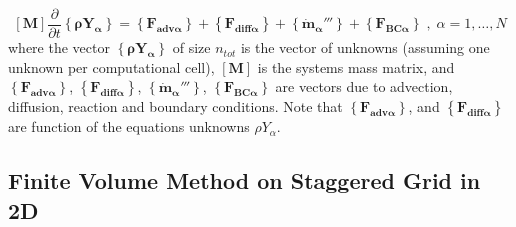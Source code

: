 %
\begin{equation}
\left[ \mathbf{M} \right] \frac{\partial}{\partial t} \left\{ \mathbf{\rho Y_\alpha} \right\}  = \left\{ \mathbf{F_{adv \alpha}} \right\} + \left\{ \mathbf{F_{diff \alpha}} \right\} + \left\{  \mathbf{\dot{m}_\alpha'''} \right\} +  \left\{ \mathbf{F_{BC \alpha}} \right\} \; , \; \alpha=1,\dots,N \label{eq:discbal3}
\end{equation}
%
where the vector $\left\{ \mathbf{\rho Y_\alpha} \right\}$ of size $n_{tot}$ is the vector of unknowns (assuming one unknown per computational cell), $\left[ \mathbf{M} \right]$ is the systems mass matrix, and $\left\{ \mathbf{F_{adv \alpha}} \right\}$, $\left\{ \mathbf{F_{diff \alpha}} \right\}$, $\left\{  \mathbf{\dot{m}_\alpha'''} \right\}$, $\left\{ \mathbf{F_{BC \alpha}} \right\}$ are vectors due to advection, diffusion, reaction and boundary conditions. Note that  $\left\{ \mathbf{F_{adv \alpha}} \right\}$, and $\left\{ \mathbf{F_{diff \alpha}} \right\}$ are function of the equations unknowns $\rho Y_\alpha$. 

\subsection{Finite Volume Method on Staggered Grid in 2D}

